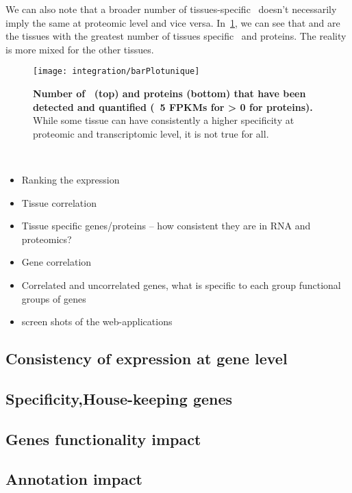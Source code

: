 We can also note that a broader number of tissues-specific \mRNAs\ doesn't
necessarily imply the same at proteomic level and vice versa.
In~\cref{fig:barPlotunique}, we can see that  and 
are the tissues with the greatest number of tissues specific \mRNAs\ and proteins.
The reality is more mixed for the other tissues.

\begin{figure}%
     \texttt{[image: integration/barPlotunique]}\centering
     \caption{\label{fig:barPlotunique} \textbf{Number of \mRNAs\ (top) and
     proteins (bottom)
     that have been detected and quantified (\geq\ 5 \glspl{FPKM} for \mRNA\; > 0
     for proteins).} While some tissue can have consistently a higher
     specificity at proteomic and transcriptomic level, it is not true for all.}
\end{figure}




\clearpage\

\begin{itemize}
\item Ranking the expression
\item Tissue correlation
\item Tissue specific genes/proteins – how consistent they are in RNA and proteomics?
\item Gene correlation
\item Correlated and uncorrelated genes, what is specific to each group
    functional groups of genes
\item screen shots of the web-applications
\end{itemize}


\subsection{Consistency of expression at gene level}
\subsection{Specificity,House-keeping genes}
\subsection{Genes functionality impact}
\subsection{Annotation impact}



